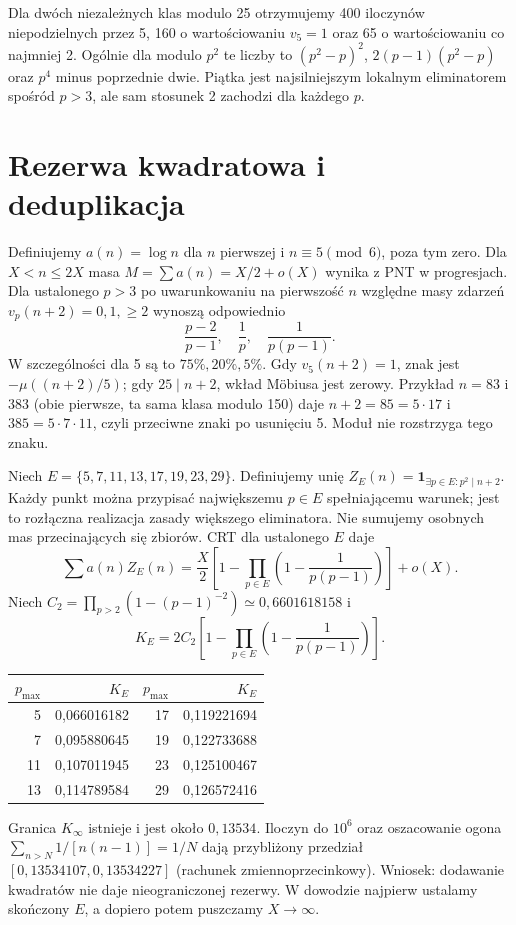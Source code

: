 \documentclass[11pt,a4paper]{article}
\newcommand{\one}{\mathbf 1}
\begin{document}
Dla dwóch niezależnych klas modulo 25 otrzymujemy 400 iloczynów niepodzielnych przez 5, 160 o wartościowaniu $v_5=1$ oraz 65 o wartościowaniu co najmniej 2. Ogólnie dla modulo $p^2$ te liczby to $(p^2-p)^2$, $2(p-1)(p^2-p)$ oraz $p^4$ minus poprzednie dwie. Piątka jest najsilniejszym lokalnym eliminatorem spośród $p>3$, ale sam stosunek 2 zachodzi dla każdego $p$.
\section{Rezerwa kwadratowa i deduplikacja}
Definiujemy $a(n)=\log n$ dla $n$ pierwszej i $n\equiv5\pmod6$, poza tym zero. Dla $X<n\le2X$ masa $M=\sum a(n)=X/2+o(X)$ wynika z PNT w progresjach. Dla ustalonego $p>3$ po uwarunkowaniu na pierwszość $n$ względne masy zdarzeń $v_p(n+2)=0,1,\ge2$ wynoszą odpowiednio
\[
 \frac{p-2}{p-1},\quad\frac1p,\quad\frac1{p(p-1)}.
\]
W szczególności dla 5 są to $75\%,20\%,5\%$. Gdy $v_5(n+2)=1$, znak jest $-\mu((n+2)/5)$; gdy $25\mid n+2$, wkład Möbiusa jest zerowy. Przykład $n=83$ i $383$ (obie pierwsze, ta sama klasa modulo 150) daje $n+2=85=5\cdot17$ i $385=5\cdot7\cdot11$, czyli przeciwne znaki po usunięciu 5. Moduł nie rozstrzyga tego znaku.

Niech $E=\{5,7,11,13,17,19,23,29\}$. Definiujemy unię $Z_E(n)=\one_{\exists p\in E:p^2\mid n+2}$. Każdy punkt można przypisać największemu $p\in E$ spełniającemu warunek; jest to rozłączna realizacja zasady większego eliminatora. Nie sumujemy osobnych mas przecinających się zbiorów. CRT dla ustalonego $E$ daje
\[
 \sum a(n)Z_E(n)=\frac X2\left[1-\prod_{p\in E}\left(1-\frac1{p(p-1)}\right)\right]+o(X).
\]
Niech $C_2=\prod_{p>2}(1-(p-1)^{-2})\simeq0{,}6601618158$ i
\begin{equation}\label{eq:K}
 K_E=2C_2\left[1-\prod_{p\in E}\left(1-\frac1{p(p-1)}\right)\right].
\end{equation}
\begin{center}\begin{tabular}{rr|rr}\toprule
$p_{\max}$&$K_E$&$p_{\max}$&$K_E$\\\midrule
5&0,066016182&17&0,119221694\\7&0,095880645&19&0,122733688\\11&0,107011945&23&0,125100467\\13&0,114789584&29&0,126572416\\\bottomrule\end{tabular}\end{center}
Granica $K_\infty$ istnieje i jest około $0{,}13534$. Iloczyn do $10^6$ oraz oszacowanie ogona $\sum_{n>N}1/[n(n-1)]=1/N$ dają przybliżony przedział $[0{,}13534107,0{,}13534227]$ (rachunek zmiennoprzecinkowy). Wniosek: dodawanie kwadratów nie daje nieograniczonej rezerwy. W dowodzie najpierw ustalamy skończony $E$, a dopiero potem puszczamy $X\to\infty$.
\end{document}
